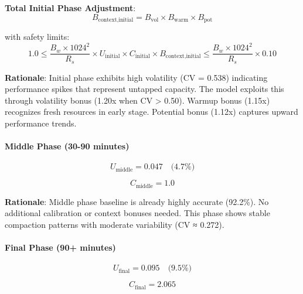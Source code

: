 \textbf{Total Initial Phase Adjustment}:
\begin{equation}
B_{\text{context,initial}} = B_{\text{vol}} \times B_{\text{warm}} \times B_{\text{pot}}
\end{equation}

with safety limits:
\begin{equation}
1.0 \leq \frac{B_w \times 1024^2}{R_s} \times U_{\text{initial}} \times C_{\text{initial}} \times B_{\text{context,initial}} \leq \frac{B_w \times 1024^2}{R_s} \times 0.10
\end{equation}

\textbf{Rationale}: Initial phase exhibits high volatility (CV = 0.538) indicating performance spikes that represent untapped capacity. The model exploits this through volatility bonus (1.20x when CV > 0.50). Warmup bonus (1.15x) recognizes fresh resources in early stage. Potential bonus (1.12x) captures upward performance trends.

\paragraph{Middle Phase (30-90 minutes)}

\begin{equation}
U_{\text{middle}} = 0.047 \quad \text{(4.7\%)}
\end{equation}

\begin{equation}
C_{\text{middle}} = 1.0
\end{equation}

\textbf{Rationale}: Middle phase baseline is already highly accurate (92.2\%). No additional calibration or context bonuses needed. This phase shows stable compaction patterns with moderate variability (CV ≈ 0.272).

\paragraph{Final Phase (90+ minutes)}

\begin{equation}
U_{\text{final}} = 0.095 \quad \text{(9.5\%)}
\end{equation}

\begin{equation}
C_{\text{final}} = 2.065
\end{equation}

